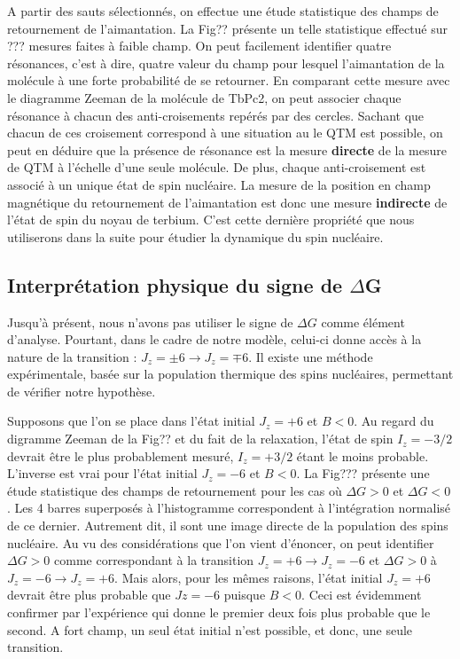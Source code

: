 A partir des sauts sélectionnés, on effectue une étude statistique des champs de retournement de l'aimantation. La Fig?? présente un telle statistique effectué sur ??? mesures faites à faible champ. On peut facilement identifier quatre résonances, c'est à dire, quatre valeur du champ pour lesquel l'aimantation de la molécule à une forte probabilité de se retourner. En comparant cette mesure avec le diagramme Zeeman de la molécule de TbPc2, on peut associer chaque résonance à chacun des anti-croisements repérés par des cercles. Sachant que chacun de ces croisement correspond à une situation au le QTM est possible, on peut en déduire que la présence de résonance est la mesure \textbf{directe} de la mesure de QTM à l'échelle d'une seule molécule. De plus, chaque anti-croisement est associé à un unique état de spin nucléaire. La mesure de la position en champ magnétique du retournement de l'aimantation est donc une mesure \textbf{indirecte} de l'état de spin du noyau de terbium. C'est cette dernière propriété que nous utiliserons dans la suite pour étudier la dynamique du spin nucléaire.


\subsection{Interprétation physique du signe de $\Delta$G}
Jusqu'à présent, nous n'avons pas utiliser le signe de $\Delta G$ comme élément d'analyse. Pourtant, dans le cadre de notre modèle, celui-ci donne accès à la nature de la transition : $J_z = \pm6 \rightarrow J_z = \mp 6$. Il existe une méthode expérimentale, basée sur la population thermique des spins nucléaires, permettant de vérifier notre hypothèse.

Supposons que l'on se place dans l'état initial $J_z=+6$ et $B<0$. Au regard du digramme Zeeman de la Fig?? et du fait de la relaxation, l'état de spin $I_z = -3/2$ devrait être le plus probablement mesuré, $I_z = +3/2$ étant le moins probable. L'inverse est vrai pour l'état initial $J_z=-6$ et $B<0$. La Fig??? présente une étude statistique des champs de retournement pour les cas où $\Delta G> 0$ et $\Delta G< 0$. Les 4 barres superposés à l'histogramme correspondent à l'intégration normalisé de ce dernier. Autrement dit, il sont une image directe de la population des spins nucléaire. Au vu des considérations que l'on vient d'énoncer, on peut identifier $\Delta G> 0$ comme correspondant à la transition $J_z = +6 \rightarrow J_z =  - 6$ et $\Delta G> 0$ à $J_z = -6 \rightarrow J_z =  + 6$. Mais alors, pour les mêmes raisons, l'état initial $J_z=+6$ devrait être plus probable que $Jz=-6$ puisque $B<0$. Ceci est évidemment confirmer par l'expérience qui donne le premier deux fois plus probable que le second. A fort champ, un seul état initial n'est possible, et donc, une seule transition. 


